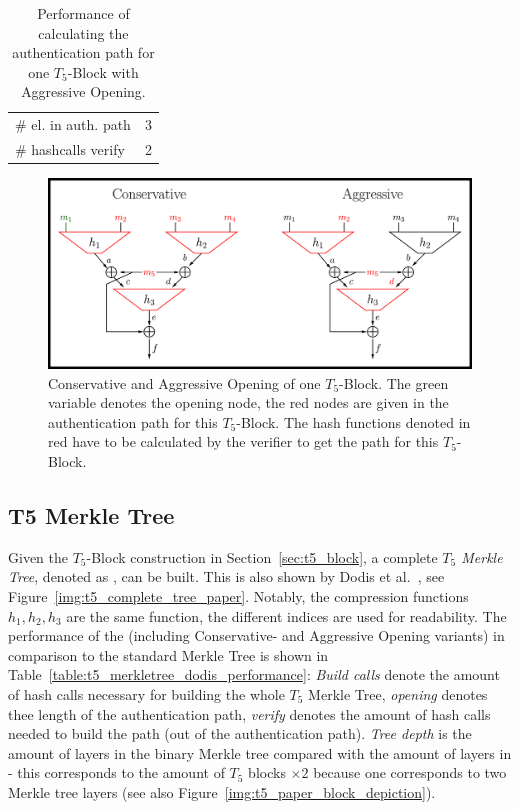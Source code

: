 \begin{table}
\centering
\begin{tabular}{l c} 
 \hline\noalign{\smallskip}
 \multicolumn{2}{c}{\textbf{Aggressive Opening}} \\
 \hline\noalign{\smallskip}
 \# el. in auth. path & 3 \\
 \# hashcalls verify & 2 \\
 \hline
\end{tabular}
\caption{Performance of calculating the authentication path for one $T_5$-Block with Aggressive Opening.}
\label{table:aggr_opening}
\end{table}

\begin{figure}
\centering
\includegraphics[]{images/Methods/aggr_conserv_opening_T5.png}
\caption{Conservative and Aggressive Opening of one $T_5$-Block. The green variable denotes the opening node, the red nodes are given in the authentication path for this $T_5$-Block. The hash functions denoted in red have to be calculated by the verifier to get the path for this $T_5$-Block.~\cite{T5_paper}}
\label{img:t5_conserv_aggr_opening}
\end{figure}

\subsection{T5 Merkle Tree}
\label{sec:dodis_t5_merkle_tree}
Given the $T_5$-Block construction in Section~\ref{sec:t5_block}, a complete \textit{$T_5$ Merkle Tree}, denoted as \textit{\tftree}, can be built. This is also shown by Dodis et al.~\cite{T5_paper}, see Figure~\ref{img:t5_complete_tree_paper}. Notably, the compression functions $h_1, h_2, h_3$ are the same function, the different indices are used for readability. The performance of the \tftree (including Conservative- and Aggressive Opening variants) in comparison to the standard Merkle Tree is shown in Table~\ref{table:t5_merkletree_dodis_performance}: \textit{Build calls} denote the amount of hash calls necessary for building the whole $T_5$ Merkle Tree, \textit{opening} denotes thee length of the authentication path, \textit{verify} denotes the amount of hash calls needed to build the path (out of the authentication path). \textit{Tree depth} is the amount of layers in the binary Merkle tree compared with the amount of layers in \tftree - this corresponds to the amount of $T_5$ blocks $\times 2$ because one \tfblock corresponds to two Merkle tree layers (see also Figure~\ref{img:t5_paper_block_depiction}).

